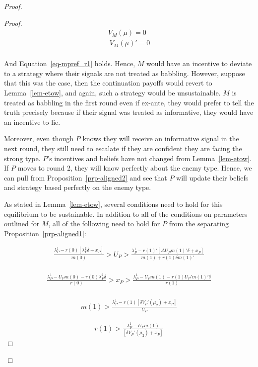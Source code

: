 \documentclass[
  12pt,
]{article}
\theoremstyle{plain}
\theoremstyle{plain}
\theoremstyle{remark}
\begin{document}
\begin{proof}
\begin{proof}
\[
\begin{aligned}
V_M(\mu)  = 0\\\
V_M(\mu)'  = 0\\
\end{aligned}
\]

And Equation~\ref{eq-mpref_r1} holds. Hence, \(M\) would have an
incentive to deviate to a strategy where their signals are not treated
as babbling. However, suppose that this was the case, then the
continuation payoffs would revert to Lemma~\ref{lem-etow}, and again,
such a strategy would be unsustainable. \(M\) is treated as babbling in
the first round even if ex-ante, they would prefer to tell the truth
precisely because if their signal was treated as informative, they would
have an incentive to lie.

Moreover, even though \(P\) knows they will receive an informative
signal in the next round, they still need to escalate if they are
confident they are facing the strong type. \(P\)'s incentives and
beliefs have not changed from Lemma~\ref{lem-etow}. If \(P\) moves to
round 2, they will know perfectly about the enemy type. Hence, we can
pull from Proposition~\ref{prp-aligned2} and see that \(P\) will update
their beliefs and strategy based perfectly on the enemy type.

As stated in Lemma~\ref{lem-etow}, several conditions need to hold for
this equilibrium to be sustainable. In addition to all of the conditions
on parameters outlined for \(M\), all of the following need to hold for
\(P\) from the separating Proposition~\ref{prp-aligned1}:

\[
\begin{aligned}
\frac{ \lambda^1_P - r(0)[\lambda^2_P \delta + x_P]}{m(0)} > U_P > \frac{\lambda^1_P - r(1)'[ \Delta U_P m(1)' \delta + x_P]}{m(1) + r(1)\delta m(1)'}\\
\end{aligned}
\]

\[
\begin{aligned}
\frac{\lambda^1_P - U_P m(0) - r(0) \lambda^2_P \delta}{r(0)} > x_P > \frac{\lambda^1_P - U_P m(1) - r(1)U_P' m(1)' \delta}{r(1)}\\
\end{aligned}
\]

\[
\begin{aligned}
m(1) > \frac{\lambda^1_P -r(1)[\delta V_P'(\mu_2) + x_P ]}{U_P}
\end{aligned}
\]

\[
\begin{aligned}
r(1) > \frac{\lambda^1_P - U_P m(1)}{[\delta V_P'(\mu_2) + x_P ]}
\end{aligned}
\]


\end{proof}
\end{proof}
\end{document}
